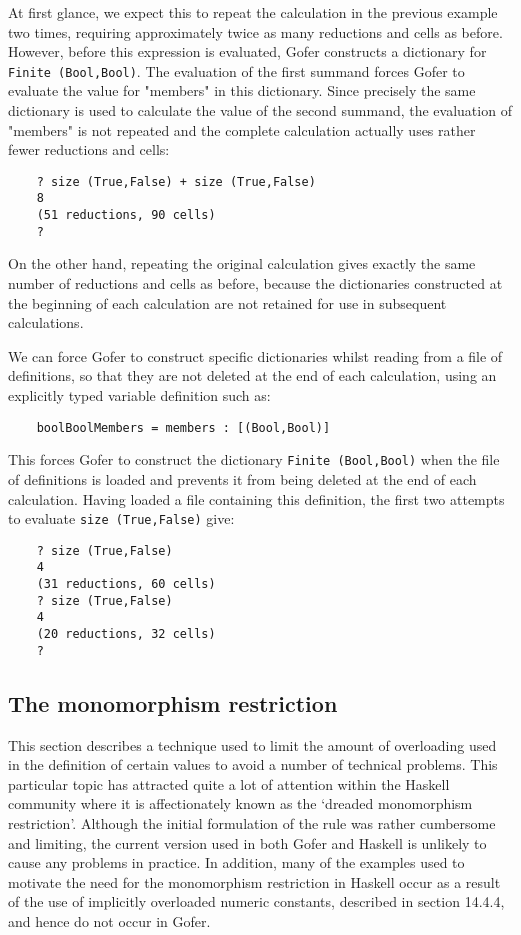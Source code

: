 At first glance, we expect  this  to  repeat  the  calculation  in  the
previous example two  times,  requiring  approximately  twice  as  many
reductions and cells as before.  However,  before  this  expression  is
evaluated, Gofer constructs a dictionary for \verb"Finite (Bool,Bool)". The
evaluation of the first summand forces Gofer to evaluate the value  for
"members" in this dictionary.  Since precisely the same  dictionary  is
used to calculate the value of the second summand,  the  evaluation  of
"members" is not repeated and the complete  calculation  actually  uses
rather fewer reductions and cells:
\begin{verbatim}
    ? size (True,False) + size (True,False)
    8
    (51 reductions, 90 cells)
    ?
\end{verbatim}
On the other hand, repeating the original calculation gives exactly the
same number of reductions and cells as before, because the dictionaries
constructed at the beginning of each calculation are not  retained  for
use in subsequent calculations.

We can force Gofer to construct specific  dictionaries  whilst  reading
from a file of definitions, so that they are not deleted at the end  of
each calculation, using an explicitly typed  variable  definition  such
as:
\begin{verbatim}
    boolBoolMembers = members : [(Bool,Bool)]
\end{verbatim}
This forces Gofer to construct the dictionary \verb"Finite (Bool,Bool)"  when
the file of definitions is loaded and prevents it from being deleted at
the end of each calculation.  Having  loaded  a  file  containing  this
definition, the  first two  attempts  to  evaluate  \verb"size (True,False)"
give:
\begin{verbatim}
    ? size (True,False)
    4
    (31 reductions, 60 cells)
    ? size (True,False)
    4
    (20 reductions, 32 cells)
    ?
\end{verbatim}

\subsection{The monomorphism restriction}
This section  describes  a  technique  used  to  limit  the  amount  of
overloading used in the definition of certain values to avoid a  number
of technical problems.  This particular topic has attracted quite a lot
of attention within the Haskell community where  it  is  affectionately
known as the `dreaded monomorphism restriction'.  Although the  initial
formulation of the rule was rather cumbersome and limiting, the current
version used in both  Gofer  and  Haskell  is  unlikely  to  cause  any
problems in practice.  In  addition,  many  of  the  examples  used  to
motivate the need for the monomorphism restriction in Haskell occur  as
a result  of  the  use  of  implicitly  overloaded  numeric  constants,
described in section 14.4.4, and hence do not occur in Gofer.

